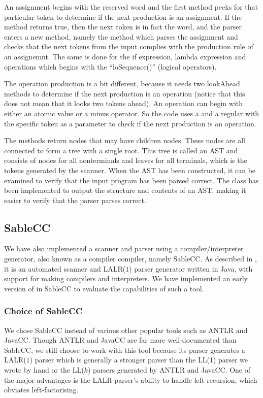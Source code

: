 An assignment begins with the reserved word  and the first
 method peeks for that particular token to determine
if the next production is an assignment. If the method returns true, then
the next token is in fact the  word, and the parser enters a
new method, namely the  method which parses the assignment and checks that the 
next tokens from the input complies with the production rule of an assignemnt. The same
is done for the if expression, lambda expression and operations which
begins with the ``loSequence()'' (logical operators).

The operation production is a bit different, because it needs two lookAhead
methods to determine if the next production is an operation (notice that this does not mean that it looks two tokens ahead). An operation can
begin with either an atomic value or a minus operator. So the code uses a
 and a regular  with the
specific token as a parameter to check if the next production is an operation.

The methods return nodes that may have children nodes. These nodes are all connected to form a tree with a single root. 
This tree is called an AST and consists of nodes for all nonterminals and leaves for all terminals, which is the tokens generated by the scanner. 
When the AST has been constructed, it can be examined to verify that the input program has been parsed correct. The class 
 has been implemented to output the structure and contents of an AST, making it easier to verify that the parser parses correct.

\subsection{SableCC}
We have also implemented a scanner and parser using a
compiler/interpreter generator, also known as a compiler compiler, namely
SableCC\cite{sableccdoc}. As described in
, it is an automated scanner and
LALR($1$) parser generator written in Java, with support for making
compilers and interpreters. We have implemented an early version of
\productname{} in SableCC to evaluate the capabilities of such a tool.

\subsubsection{Choice of SableCC}
We chose SableCC instead of various other popular tools such as
ANTLR\cite{antlr} and JavaCC\cite{javacc}. Though ANTLR and JavaCC are
far more well-documented than SableCC, we still choose to work with
this tool because its parser generates a LALR($1$) parser which is generally a 
stronger parser than the LL(1) parser we wrote by hand or the LL($k$) parsers 
generated by ANTLR and JavaCC. One of the major advantages is the LALR-parser's 
ability to handle left-recursion, which obviates left-factorising.

